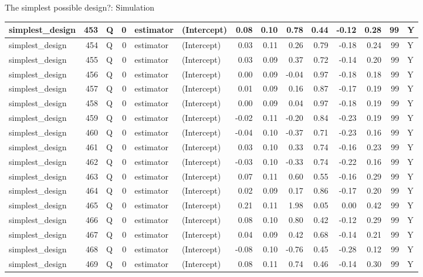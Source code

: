 \documentclass[
  11pt,
  ignorenonframetext,
]{beamer}
\begin{document}
\begin{frame}[fragile]{The simplest possible design?: Simulation}
\begin{tabular}{l|r|l|r|l|l|r|r|r|r|r|r|r|l}
\hline
simplest\_design & 453 & Q & 0 & estimator & (Intercept) & 0.08 & 0.10 & 0.78 & 0.44 & -0.12 & 0.28 & 99 & Y\\
\hline
simplest\_design & 454 & Q & 0 & estimator & (Intercept) & 0.03 & 0.11 & 0.26 & 0.79 & -0.18 & 0.24 & 99 & Y\\
\hline
simplest\_design & 455 & Q & 0 & estimator & (Intercept) & 0.03 & 0.09 & 0.37 & 0.72 & -0.14 & 0.20 & 99 & Y\\
\hline
simplest\_design & 456 & Q & 0 & estimator & (Intercept) & 0.00 & 0.09 & -0.04 & 0.97 & -0.18 & 0.18 & 99 & Y\\
\hline
simplest\_design & 457 & Q & 0 & estimator & (Intercept) & 0.01 & 0.09 & 0.16 & 0.87 & -0.17 & 0.19 & 99 & Y\\
\hline
simplest\_design & 458 & Q & 0 & estimator & (Intercept) & 0.00 & 0.09 & 0.04 & 0.97 & -0.18 & 0.19 & 99 & Y\\
\hline
simplest\_design & 459 & Q & 0 & estimator & (Intercept) & -0.02 & 0.11 & -0.20 & 0.84 & -0.23 & 0.19 & 99 & Y\\
\hline
simplest\_design & 460 & Q & 0 & estimator & (Intercept) & -0.04 & 0.10 & -0.37 & 0.71 & -0.23 & 0.16 & 99 & Y\\
\hline
simplest\_design & 461 & Q & 0 & estimator & (Intercept) & 0.03 & 0.10 & 0.33 & 0.74 & -0.16 & 0.23 & 99 & Y\\
\hline
simplest\_design & 462 & Q & 0 & estimator & (Intercept) & -0.03 & 0.10 & -0.33 & 0.74 & -0.22 & 0.16 & 99 & Y\\
\hline
simplest\_design & 463 & Q & 0 & estimator & (Intercept) & 0.07 & 0.11 & 0.60 & 0.55 & -0.16 & 0.29 & 99 & Y\\
\hline
simplest\_design & 464 & Q & 0 & estimator & (Intercept) & 0.02 & 0.09 & 0.17 & 0.86 & -0.17 & 0.20 & 99 & Y\\
\hline
simplest\_design & 465 & Q & 0 & estimator & (Intercept) & 0.21 & 0.11 & 1.98 & 0.05 & 0.00 & 0.42 & 99 & Y\\
\hline
simplest\_design & 466 & Q & 0 & estimator & (Intercept) & 0.08 & 0.10 & 0.80 & 0.42 & -0.12 & 0.29 & 99 & Y\\
\hline
simplest\_design & 467 & Q & 0 & estimator & (Intercept) & 0.04 & 0.09 & 0.42 & 0.68 & -0.14 & 0.21 & 99 & Y\\
\hline
simplest\_design & 468 & Q & 0 & estimator & (Intercept) & -0.08 & 0.10 & -0.76 & 0.45 & -0.28 & 0.12 & 99 & Y\\
\hline
simplest\_design & 469 & Q & 0 & estimator & (Intercept) & 0.08 & 0.11 & 0.74 & 0.46 & -0.14 & 0.30 & 99 & Y\\

\end{tabular}
\end{frame}
\end{document}
